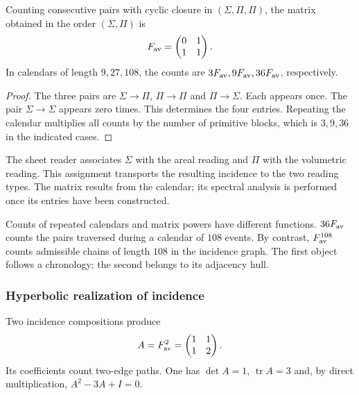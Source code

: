 \begin{teorema}
\label{eul:teo:fav}
Counting consecutive pairs with cyclic closure in
\((\Sigma,\Pi,\Pi)\), the matrix obtained in the order \((\Sigma,\Pi)\)
is
\[
 F_{\rm av}=\begin{pmatrix}0&1\\1&1\end{pmatrix}.
\]
In calendars of length \(9,27,108\), the counts are
\(3F_{\rm av},9F_{\rm av},36F_{\rm av}\), respectively.
\end{teorema}
\begin{proof}
The three pairs are \(\Sigma\to\Pi\), \(\Pi\to\Pi\) and
\(\Pi\to\Sigma\). Each appears once. The pair
\(\Sigma\to\Sigma\) appears zero times. This determines the four
entries. Repeating the calendar multiplies all counts
by the number of primitive blocks, which is \(3,9,36\) in the indicated
cases.
\end{proof}

The sheet reader associates \(\Sigma\) with the areal reading and \(\Pi\) with
the volumetric reading. This assignment transports the resulting incidence to
the two reading types. The matrix results from the calendar; its spectral
analysis is performed once its entries have been constructed.

Counts of repeated calendars and matrix powers have
different functions. \(36F_{\rm av}\) counts the pairs traversed
during a calendar of \(108\) events. By contrast,
\(F_{\rm av}^{108}\) counts admissible chains of length \(108\)
in the incidence graph. The first object follows a chronology;
the second belongs to its adjacency hull.

\subsubsection{Hyperbolic realization of incidence}

Two incidence compositions produce
\[
 A=F_{\rm av}^2=\begin{pmatrix}1&1\\1&2\end{pmatrix}.
\]
Its coefficients count two-edge paths. One has
\(\det A=1\), \(\operatorname{tr}A=3\) and, by direct multiplication,
\(A^2-3A+I=0\).

